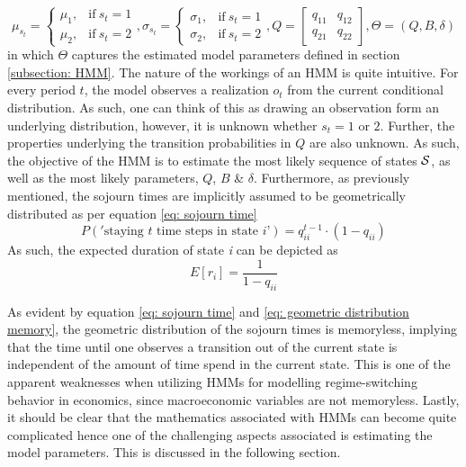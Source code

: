 $$
    \mu_{s_t}=
    \begin{cases}
        \mu_1, & \text{if}\ s_t = 1 \\
        \mu_2, & \text{if}\ s_t = 2
    \end{cases},
    \sigma_{s_t} =
    \begin{cases}
        \sigma_1, & \text{if}\ s_t = 1 \\
        \sigma_2, & \text{if}\ s_t = 2
    \end{cases},
    Q = 
    \begin{bmatrix}
    q_{11} & q_{12} \\
    q_{21} & q_{22}
    \end{bmatrix},
    \Theta = (Q, B, \delta)
$$
in which $\Theta$ captures the estimated model parameters defined in section \ref{subsection: HMM}. The nature of the workings of an HMM is quite intuitive. For every period $t$, the model observes a realization $o_t$ from the current conditional distribution. As such, one can think of this as drawing an observation form an underlying distribution, however, it is unknown whether $s_t = 1$ or $2$. Further, the properties underlying the transition probabilities in $Q$ are also unknown. As such, the objective of the HMM is to estimate the most likely sequence of states $\S$, as well as the most likely parameters, $Q$, $B$ \& $\delta$. Furthermore, as previously mentioned, the sojourn times are implicitly assumed to be geometrically distributed as per equation \ref{eq: sojourn time}
\begin{equation}
    P('\text{staying $t$ time steps in state $i$'}) = q^{t-1}_{ii} \cdot(1-q_{ii})
    \label{eq: sojourn time}
\end{equation}
As such, the expected duration of state \textit{i} can be depicted as 
\begin{equation}
    E[r_i] = \frac{1}{1-q_{ii}}
    \label{eq: geometric distribution memory}
\end{equation}

As evident by equation \ref{eq: sojourn time} and \ref{eq: geometric distribution memory}, the geometric distribution of the sojourn times is memoryless, implying that the time until one observes a transition out of the current state is independent of the amount of time spend in the current state. This is one of the apparent weaknesses when utilizing HMMs for modelling regime-switching behavior in economics, since macroeconomic variables are not memoryless. Lastly, it should be clear that the mathematics associated with HMMs can become quite complicated hence one of the challenging aspects associated is estimating the model parameters. This is discussed in the following section.

